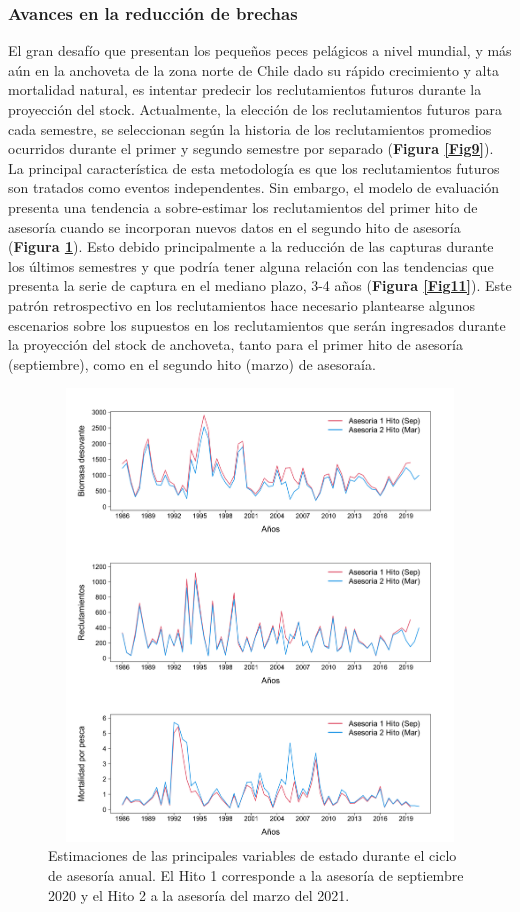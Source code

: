 \documentclass[letter,11pt]{article}
\begin{document}
\subsubsection{Avances en la reducci\'on de brechas}

El gran desaf\'io que presentan los peque\~{n}os peces pel\'agicos a nivel
mundial, y m\'as a\'un en la anchoveta de la zona norte de Chile dado su
r\'apido crecimiento y alta mortalidad natural, es intentar predecir los
reclutamientos futuros durante la proyecci\'on del stock. Actualmente, la
elecci\'on de los reclutamientos futuros para cada semestre, se
seleccionan seg\'un la historia de los reclutamientos promedios ocurridos
durante el primer y segundo semestre por separado
(\textbf{Figura \ref{Fig9}}). La principal caracter\'istica de esta
metodolog\'ia es que los reclutamientos futuros son tratados como eventos
independentes. Sin embargo, el modelo de evaluaci\'on presenta una
tendencia a sobre-estimar los reclutamientos del primer hito de asesor\'ia
cuando se incorporan nuevos datos en el segundo hito de asesor\'ia
(\textbf{Figura \ref{Fig20}}). Esto debido principalmente a la reducci\'on
de las capturas durante los \'ultimos semestres y que podr\'ia tener alguna
relaci\'on con las tendencias que presenta la serie de captura en el
mediano plazo, 3-4 a\~{n}os (\textbf{Figura \ref{Fig11}}). Este patr\'on
retrospectivo en los reclutamientos hace necesario plantearse algunos
escenarios sobre los supuestos en los reclutamientos que ser\'an
ingresados durante la proyecci\'on del stock de anchoveta, tanto para el
primer hito de asesor\'ia (septiembre), como en el segundo hito (marzo) de
asesora\'ia.

\pagebreak

\vspace{0.5cm}
\begin{figure}[htb!]
 \centering
 \includegraphics[width=15cm,height=12cm]{Figuras/figura20.pdf}
 \caption{Estimaciones de las principales variables de estado durante el ciclo de asesor\'ia anual. El Hito 1 corresponde a la asesor\'ia de septiembre 2020 y el Hito 2 a la asesor\'ia del marzo del 2021.}
 \label{Fig20}
\end{figure}
\end{document}
